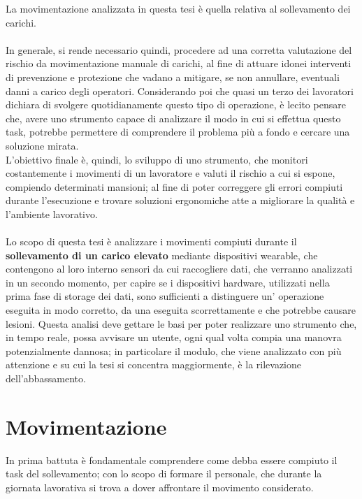 \documentclass[a4paper, oneside]{book}
\begin{document}
La movimentazione analizzata in questa tesi è quella relativa al sollevamento dei carichi. \\ \\
In generale, si rende necessario quindi, procedere ad una corretta valutazione del rischio da movimentazione manuale di carichi, al fine di attuare idonei interventi di prevenzione e protezione che vadano a mitigare, se non annullare, eventuali danni a carico degli operatori. Considerando poi che quasi un terzo dei lavoratori dichiara di svolgere quotidianamente questo tipo di operazione, è lecito pensare che, avere uno strumento capace di analizzare il modo in cui si effettua questo task, potrebbe permettere di comprendere il problema più a fondo e cercare una soluzione mirata.\\
L'obiettivo finale è, quindi, lo sviluppo di uno strumento, che monitori costantemente i movimenti di un lavoratore e valuti il rischio a cui si espone, compiendo determinati mansioni; al fine di poter correggere gli errori compiuti durante l'esecuzione e trovare soluzioni ergonomiche atte a migliorare la qualità e l'ambiente lavorativo.\\ \\
Lo scopo di questa tesi è analizzare i movimenti compiuti durante il \textbf{sollevamento di un carico elevato} mediante dispositivi wearable, che contengono al loro interno sensori da cui raccogliere dati, che verranno analizzati in un secondo momento, per capire se i dispositivi hardware, utilizzati nella prima fase di storage dei dati, sono sufficienti a distinguere un' operazione eseguita in modo corretto, da una eseguita scorrettamente e che potrebbe causare lesioni. Questa analisi deve gettare le basi per poter realizzare uno strumento che, in tempo reale, possa avvisare un utente, ogni qual volta compia una manovra potenzialmente dannosa; in particolare il modulo, che viene analizzato con più attenzione e su cui la tesi si concentra maggiormente, è la rilevazione dell'abbassamento.


	\clearpage

	\chapter{Movimentazione}

In prima battuta è fondamentale comprendere come debba essere compiuto il task del sollevamento; con lo scopo di formare il personale, che durante la giornata lavorativa si trova a dover affrontare il movimento considerato. 
\end{document}
